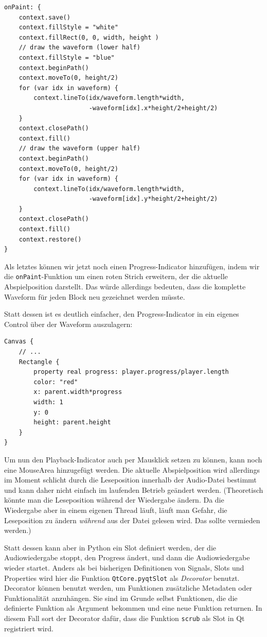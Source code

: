 \documentclass[a4paper]{article}
\begin{document}
\begin{verbatim}
onPaint: {
    context.save()
    context.fillStyle = "white"
    context.fillRect(0, 0, width, height )
    // draw the waveform (lower half)
    context.fillStyle = "blue"
    context.beginPath()
    context.moveTo(0, height/2)
    for (var idx in waveform) {
        context.lineTo(idx/waveform.length*width,
                       -waveform[idx].x*height/2+height/2)
    }
    context.closePath()
    context.fill()
    // draw the waveform (upper half)
    context.beginPath()
    context.moveTo(0, height/2)
    for (var idx in waveform) {
        context.lineTo(idx/waveform.length*width,
                       -waveform[idx].y*height/2+height/2)
    }
    context.closePath()
    context.fill()
    context.restore()
}
\end{verbatim}

Als letztes können wir jetzt noch einen Progress-Indicator hinzufügen, indem wir die \verb~onPaint~-Funktion um einen roten Strich erweitern, der die aktuelle Abspielposition darstellt. Das würde allerdings bedeuten, dass die komplette Waveform für jeden Block neu gezeichnet werden müsste.

Statt dessen ist es deutlich einfacher, den Progress-Indicator in ein eigenes Control über der Waveform auszulagern:

\begin{verbatim}
Canvas {
    // ...
    Rectangle {
        property real progress: player.progress/player.length
        color: "red"
        x: parent.width*progress
        width: 1
        y: 0
        height: parent.height
    }
}
\end{verbatim}

Um nun den Playback-Indicator auch per Mausklick setzen zu können, kann noch eine MouseArea hinzugefügt werden. Die aktuelle Abspielposition wird allerdings im Moment schlicht durch die Leseposition innerhalb der Audio-Datei bestimmt und kann daher nicht einfach im laufenden Betrieb geändert werden. (Theoretisch könnte man die Leseposition während der Wiedergabe ändern. Da die Wiedergabe aber in einem eigenen Thread läuft, läuft man Gefahr, die Leseposition zu ändern \emph{während} aus der Datei gelesen wird. Das sollte vermieden werden.)

Statt dessen kann aber in Python ein Slot definiert werden, der die Audiowiedergabe stoppt, den Progress ändert, und dann die Audiowiedergabe wieder startet. Anders als bei bisherigen Definitionen von Signals, Slots und Properties wird hier die Funktion \verb~QtCore.pyqtSlot~ als \emph{Decorator} benutzt. Decorator können benutzt werden, um Funktionen zusätzliche Metadaten oder Funktionalität anzuhängen. Sie sind im Grunde selbst Funktionen, die die definierte Funktion als Argument bekommen und eine neue Funktion returnen. In diesem Fall sort der Decorator dafür, dass die Funktion \verb~scrub~ als Slot in Qt registriert wird.
\end{document}
